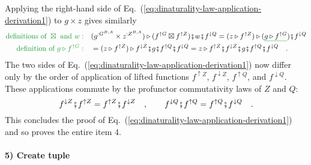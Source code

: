 Applying the right-hand side of Eq.~(\ref{eq:dinaturality-law-application-derivation1})
to $g\times z$ gives similarly
\begin{align*}
{\color{greenunder}\text{definitions of }\boxtimes\text{ and }w:}\quad & (g^{:G^{B,A}}\times z^{:Z^{B,A}})\triangleright(f^{\uparrow G}\boxtimes f^{\uparrow Z})\bef w\bef f^{\downarrow Q}=(z\triangleright f^{\uparrow Z})\triangleright(\gunderline{g\triangleright f^{\uparrow G}})\bef f^{\downarrow Q}\\
{\color{greenunder}\text{definition of }g\triangleright f^{\uparrow G}:}\quad & =(z\triangleright f^{\uparrow Z})\triangleright f^{\downarrow Z}\bef g\bef f^{\uparrow Q}\bef f^{\downarrow Q}=z\triangleright f^{\uparrow Z}\bef f^{\downarrow Z}\bef g\bef f^{\uparrow Q}\bef f^{\downarrow Q}\quad.
\end{align*}
The two sides of Eq.~(\ref{eq:dinaturality-law-application-derivation1})
now differ only by the order of application of lifted functions $f^{\uparrow Z}$,
$f^{\downarrow Z}$, $f^{\uparrow Q}$, and $f^{\downarrow Q}$. These
applications commute by the profunctor commutativity laws of $Z$
and $Q$:
\[
f^{\downarrow Z}\bef f^{\uparrow Z}=f^{\uparrow Z}\bef f^{\downarrow Z}\quad,\quad\quad f^{\downarrow Q}\bef f^{\uparrow Q}=f^{\uparrow Q}\bef f^{\downarrow Q}\quad.
\]
This concludes the proof of Eq.~(\ref{eq:dinaturality-law-application-derivation1})
and so proves the entire item 4.

\paragraph{5) Create tuple }

